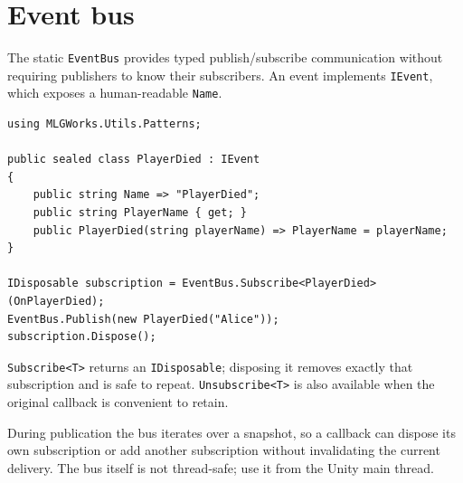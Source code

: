 \section{Event bus}
\label{sec:event-bus}

The static \texttt{EventBus} provides typed publish/subscribe communication without requiring publishers to know their subscribers. An event implements \texttt{IEvent}, which exposes a human-readable \texttt{Name}.

\begin{lstlisting}
using MLGWorks.Utils.Patterns;

public sealed class PlayerDied : IEvent
{
    public string Name => "PlayerDied";
    public string PlayerName { get; }
    public PlayerDied(string playerName) => PlayerName = playerName;
}

IDisposable subscription = EventBus.Subscribe<PlayerDied>(OnPlayerDied);
EventBus.Publish(new PlayerDied("Alice"));
subscription.Dispose();
\end{lstlisting}

\texttt{Subscribe<T>} returns an \texttt{IDisposable}; disposing it removes exactly that subscription and is safe to repeat. \texttt{Unsubscribe<T>} is also available when the original callback is convenient to retain.

During publication the bus iterates over a snapshot, so a callback can dispose its own subscription or add another subscription without invalidating the current delivery. The bus itself is not thread-safe; use it from the Unity main thread.
